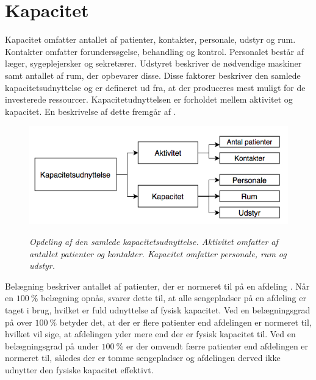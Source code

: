\section{Kapacitet} \label{kap}
Kapacitet omfatter antallet af patienter, kontakter, personale, udstyr og rum. Kontakter omfatter forundersøgelse, behandling og kontrol. Personalet består af læger, sygeplejersker og sekretærer. Udstyret beskriver de nødvendige maskiner samt antallet af rum, der opbevarer disse. Disse faktorer beskriver den samlede kapacitetsudnyttelse og er defineret ud fra, at der produceres mest muligt for de investerede ressourcer. Kapacitetudnyttelsen er forholdet mellem aktivitet og kapacitet. \cite{Company2013} En beskrivelse af dette fremgår af . 

\begin{figure}[H]
	\flushleft 
	\centering
	\includegraphics[scale=.45]{figures/Kapacitetsudnyttelse.png}
	\label{kapacitet}
	\flushleft
	\caption{\textit{Opdeling af den samlede kapacitetsudnyttelse. Aktivitet omfatter af antallet patienter og kontakter. Kapacitet omfatter personale, rum og udstyr. \cite{Company2013}}}
\end{figure}

\noindent
Belægning beskriver antallet af patienter, der er normeret til på en afdeling \cite{Heidmann2014}. Når en $100~\%$ belægning opnås, svarer dette til, at alle sengepladser på en afdeling er taget i brug, hvilket er fuld udnyttelse af fysisk kapacitet. Ved en belægningsgrad på over $100~\%$ betyder det, at der er flere patienter end afdelingen er normeret til, hvilket vil sige, at afdelingen yder mere end der er fysisk kapacitet til. Ved en belægningsgrad på under $100~\%$ er der omvendt færre patienter end afdelingen er normeret til, således der er tomme sengepladser og afdelingen derved ikke udnytter den fysiske kapacitet effektivt. \cite{Pauly1986} 

